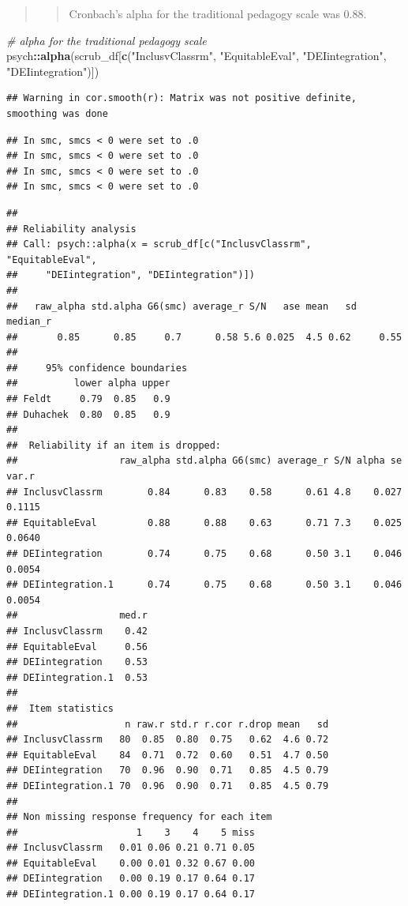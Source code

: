 \documentclass[
  11pt,
]{book}
\newenvironment{Shaded}{\begin{snugshade}}{\end{snugshade}}
\newcommand{\CommentTok}[1]{\textcolor[rgb]{0.37,0.37,0.37}{\textit{#1}}}
\newcommand{\FunctionTok}[1]{\textcolor[rgb]{0.27,0.27,0.27}{\textbf{#1}}}
\newcommand{\NormalTok}[1]{#1}
\newcommand{\SpecialCharTok}[1]{\textcolor[rgb]{0.43,0.43,0.43}{\textbf{#1}}}
\newcommand{\StringTok}[1]{\textcolor[rgb]{0.5,0.5,0.5}{#1}}
\begin{document}
\begin{quote}
\begin{quote}
Cronbach's alpha for the traditional pedagogy scale was 0.88.
\end{quote}
\end{quote}

\begin{Shaded}
\begin{Highlighting}[]
\CommentTok{\# alpha for the traditional pedagogy scale}
\NormalTok{psych}\SpecialCharTok{::}\FunctionTok{alpha}\NormalTok{(scrub\_df[}\FunctionTok{c}\NormalTok{(}\StringTok{"InclusvClassrm"}\NormalTok{, }\StringTok{"EquitableEval"}\NormalTok{, }\StringTok{"DEIintegration"}\NormalTok{,}
    \StringTok{"DEIintegration"}\NormalTok{)])}
\end{Highlighting}
\end{Shaded}

\begin{verbatim}
## Warning in cor.smooth(r): Matrix was not positive definite, smoothing was done
\end{verbatim}

\begin{verbatim}
## In smc, smcs < 0 were set to .0
## In smc, smcs < 0 were set to .0
## In smc, smcs < 0 were set to .0
## In smc, smcs < 0 were set to .0
\end{verbatim}

\begin{verbatim}
## 
## Reliability analysis   
## Call: psych::alpha(x = scrub_df[c("InclusvClassrm", "EquitableEval", 
##     "DEIintegration", "DEIintegration")])
## 
##   raw_alpha std.alpha G6(smc) average_r S/N   ase mean   sd median_r
##       0.85      0.85     0.7      0.58 5.6 0.025  4.5 0.62     0.55
## 
##     95% confidence boundaries 
##          lower alpha upper
## Feldt     0.79  0.85   0.9
## Duhachek  0.80  0.85   0.9
## 
##  Reliability if an item is dropped:
##                  raw_alpha std.alpha G6(smc) average_r S/N alpha se  var.r
## InclusvClassrm        0.84      0.83    0.58      0.61 4.8    0.027 0.1115
## EquitableEval         0.88      0.88    0.63      0.71 7.3    0.025 0.0640
## DEIintegration        0.74      0.75    0.68      0.50 3.1    0.046 0.0054
## DEIintegration.1      0.74      0.75    0.68      0.50 3.1    0.046 0.0054
##                  med.r
## InclusvClassrm    0.42
## EquitableEval     0.56
## DEIintegration    0.53
## DEIintegration.1  0.53
## 
##  Item statistics 
##                   n raw.r std.r r.cor r.drop mean   sd
## InclusvClassrm   80  0.85  0.80  0.75   0.62  4.6 0.72
## EquitableEval    84  0.71  0.72  0.60   0.51  4.7 0.50
## DEIintegration   70  0.96  0.90  0.71   0.85  4.5 0.79
## DEIintegration.1 70  0.96  0.90  0.71   0.85  4.5 0.79
## 
## Non missing response frequency for each item
##                     1    3    4    5 miss
## InclusvClassrm   0.01 0.06 0.21 0.71 0.05
## EquitableEval    0.00 0.01 0.32 0.67 0.00
## DEIintegration   0.00 0.19 0.17 0.64 0.17
## DEIintegration.1 0.00 0.19 0.17 0.64 0.17
\end{verbatim}
\end{document}
